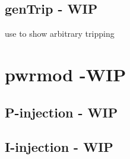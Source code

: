 	\subsection{genTrip - WIP} 
use to show arbitrary tripping


\pagebreak
\section{pwrmod -WIP} \label{sec: pwrmodExamples}
\subsection{P-injection - WIP}
\subsection{I-injection - WIP}

\pagebreak

